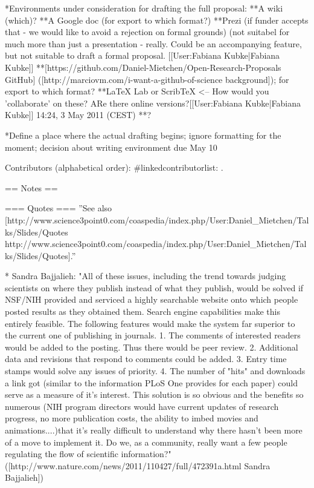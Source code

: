 *Environments under consideration for drafting the full proposal:
**A wiki (which)?
**A Google doc (for export to which format?)
**Prezi (if funder accepts that - we would like to avoid a rejection on formal grounds) (not suitabel for much more than just a presentation - really. Could be an accompanying feature, but not suitable to draft a formal proposal. [[User:Fabiana Kubke|Fabiana Kubke]]
**[https://github.com/Daniel-Mietchen/Open-Research-Proposals GitHub] ([http://marciovm.com/i-want-a-github-of-science background]); for export to which format?
**LaTeX Lab or ScribTeX <-- How would you 'collaborate' on these? ARe there online versions?[[User:Fabiana Kubke|Fabiana Kubke]] 14:24, 3 May 2011 (CEST)
**?

*Define a place where the actual drafting begins; ignore formatting for the moment; decision about writing environment due May 10

Contributors (alphabetical order): {{#linkedcontributorlist: }}.

== Notes ==

=== Quotes ===
''See also [http://www.science3point0.com/coaspedia/index.php/User:Daniel_Mietchen/Talks/Slides/Quotes http://www.science3point0.com/coaspedia/index.php/User:Daniel_Mietchen/Talks/Slides/Quotes].''

* Sandra Bajjalieh: "All of these issues, including the trend towards judging scientists on where they publish instead of what they publish, would be solved if NSF/NIH provided and serviced a highly searchable website onto which people posted results as they obtained them. Search engine capabilities make this entirely feasible. The following features would make the system far superior to the current one of publishing in journals. 1. The comments of interested readers would be added to the posting. Thus there would be peer review. 2. Additional data and revisions that respond to comments could be added. 3. Entry time stamps would solve any issues of priority. 4. The number of "hits" and downloads a link got (similar to the information PLoS One provides for each paper) could serve as a measure of it's interest. This solution is so obvious and the benefits so numerous (NIH program directors would have current updates of research progress, no more publication costs, the ability to imbed movies and animations....)that it's really difficult to understand why there hasn't been more of a move to implement it. Do we, as a community, really want a few people regulating the flow of scientific information?" ([http://www.nature.com/news/2011/110427/full/472391a.html Sandra Bajjalieh])

